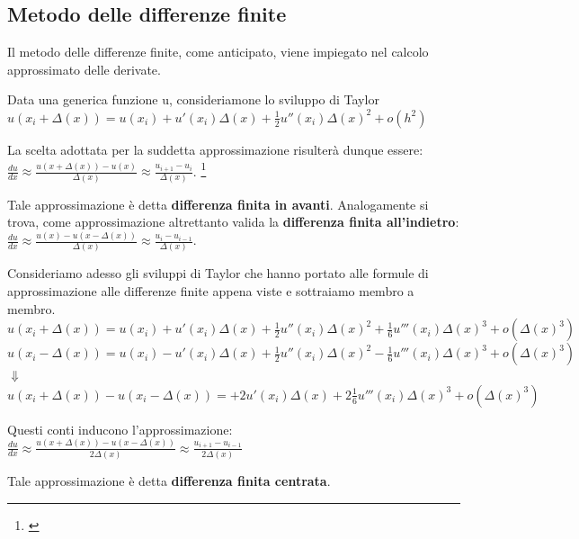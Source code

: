 \subsection{Metodo delle differenze finite}
\raggedright
Il metodo delle differenze finite, come anticipato, viene impiegato nel calcolo approssimato delle derivate. 
\vspace{-0.5em}
\begin{definizione}

Data una generica funzione u, consideriamone lo sviluppo di Taylor\\
\vspace{0.25em}
\centering
$u(x_i+\Delta(x))=u(x_i)+u'(x_i)\Delta(x)+\frac{1}{2}u''(x_i)\Delta(x)^2+o(h^2)$ \\
\vspace{0.25em}
\raggedright
La scelta adottata per la suddetta approssimazione risulterà dunque essere:\\
\vspace{0.25em}
\centering 
$\frac{du}{dx}\approx\frac{u(x+\Delta(x))-u(x)}{\Delta(x)} \approx \frac{u_{i+1} - u_i}{\Delta(x)} $.
\footnote{\cite{FD}}\\
\vspace{0.25em}
\raggedright
Tale approssimazione è detta \textbf{differenza finita in avanti}. Analogamente si trova, come approssimazione altrettanto valida la \textbf{differenza finita all'indietro}:\\
\vspace{0.25em}
\centering 
$\frac{du}{dx}\approx\frac{u(x)-u(x-\Delta(x))}{\Delta(x)} \approx \frac{u_i - u_{i-1}}{\Delta(x)} $.\\
\vspace{0.25em}
\raggedright
\end{definizione}
\begin{definizione}
Consideriamo adesso gli sviluppi di Taylor che hanno portato alle formule di approssimazione alle differenze finite appena viste e sottraiamo membro a membro.\\
\vspace{0.25em}
\centering
$u(x_i+\Delta(x))=u(x_i)+u'(x_i)\Delta(x)+\frac{1}{2}u''(x_i)\Delta(x)^2+\frac{1}{6}u'''(x_i)\Delta(x)^3+o(\Delta(x)^3)$ \\
\vspace{0.25em}
$u(x_i-\Delta(x))=u(x_i)-u'(x_i)\Delta(x)+\frac{1}{2}u''(x_i)\Delta(x)^2-\frac{1}{6}u'''(x_i)\Delta(x)^3+o(\Delta(x)^3)$ \\
$\Downarrow$\\
$u(x_i+\Delta(x))-u(x_i-\Delta(x))=+2u'(x_i)\Delta(x)+2\frac{1}{6}u'''(x_i)\Delta(x)^3+o(\Delta(x)^3)$ \\
\vspace{0.25em}
\raggedright
Questi conti inducono l'approssimazione:\\
\vspace{0.25em}
\centering 
$\frac{du}{dx}\approx\frac{u(x+\Delta(x))-u(x-\Delta(x))}{2\Delta(x)} \approx \frac{u_{i+1} - u_{i-1}}{2\Delta(x)}$\\
\vspace{0.25em}
\raggedright
Tale approssimazione è detta \textbf{differenza finita centrata}.
\end{definizione}

